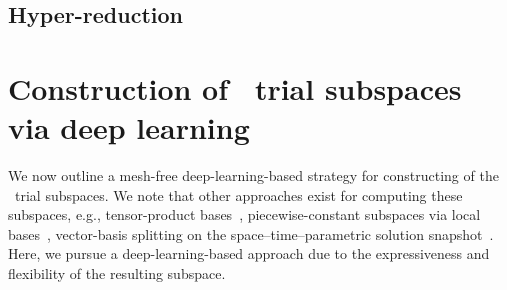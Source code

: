 \documentclass[3p,computermodern,10pt]{elsarticle}
\begin{document}
%
\subsection{Hyper-reduction}

\section{Construction of \parametricSpaceTimeAcronym\ trial subspaces via deep learning}
We now outline a mesh-free deep-learning-based strategy for constructing of the \parametricSpaceTimeAcronym\ trial subspaces. We note that other approaches exist for computing these subspaces, e.g., tensor-product bases~\cite{choi_stlspg}, piecewise-constant subspaces via local bases~\cite{}, vector-basis splitting on the space--time--parametric solution snapshot~\cite{carlberg_hadaptation,ETTER2020112931}. Here, we pursue a deep-learning-based approach due to the expressiveness and flexibility of the resulting subspace.
\end{document}
